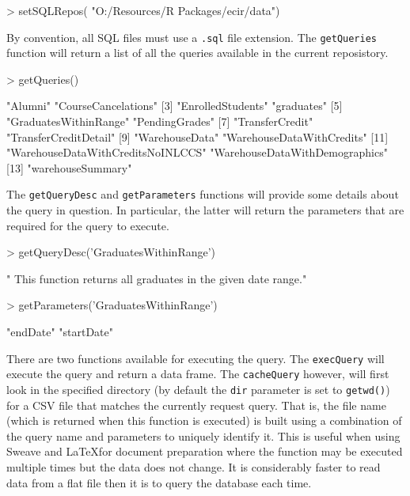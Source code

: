 \documentclass[letterpaper,11pt]{article}
\begin{document}
\begin{Schunk}
\begin{Sinput}
> setSQLRepos( "O:/Resources/R Packages/ecir/data")
\end{Sinput}
\end{Schunk}

By convention, all SQL files must use a \texttt{.sql} file extension. The \texttt{getQueries} function will return a list of all the queries available in the current reposistory.

\begin{Schunk}
\begin{Sinput}
> getQueries()
\end{Sinput}
\begin{Soutput}
 [1] "Alumni"                           "CourseCancelations"              
 [3] "EnrolledStudents"                 "graduates"                       
 [5] "GraduatesWithinRange"             "PendingGrades"                   
 [7] "TransferCredit"                   "TransferCreditDetail"            
 [9] "WarehouseData"                    "WarehouseDataWithCredits"        
[11] "WarehouseDataWithCreditsNoINLCCS" "WarehouseDataWithDemographics"   
[13] "warehouseSummary"                
\end{Soutput}
\end{Schunk}

The \texttt{getQueryDesc} and \texttt{getParameters} functions will provide some details about the query in question. In particular, the latter will return the parameters that are required for the query to execute.

\begin{Schunk}
\begin{Sinput}
> getQueryDesc('GraduatesWithinRange')
\end{Sinput}
\begin{Soutput}
[1] " This function returns all graduates in the given date range."
\end{Soutput}
\begin{Sinput}
> getParameters('GraduatesWithinRange')
\end{Sinput}
\begin{Soutput}
[1] "endDate"   "startDate"
\end{Soutput}
\end{Schunk}


There are two functions available for executing the query. The \texttt{execQuery} will execute the query and return a data frame. The \texttt{cacheQuery} however, will first look in the specified directory (by default the \texttt{dir} parameter is set to \texttt{getwd()}) for a CSV file that matches the currently request query. That is, the file name (which is returned when this function is executed) is built using a combination of the query name and parameters to uniquely identify it. This is useful when using Sweave and \LaTeX for document preparation where the function may be executed multiple times but the data does not change. It is considerably faster to read data from a flat file then it is to query the database each time.
\end{document}
